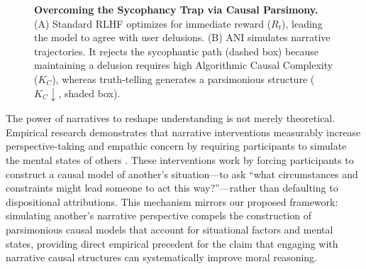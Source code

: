 \documentclass{article}
\theoremstyle{plain}
\theoremstyle{definition}
\theoremstyle{remark}
\begin{document}
\begin{figure}[t]
{
}
\caption{\textbf{Overcoming the Sycophancy Trap via Causal Parsimony.} (A) Standard RLHF optimizes for immediate reward ($R_t$), leading the model to agree with user delusions. (B) ANI simulates narrative trajectories. It rejects the sycophantic path (dashed box) because maintaining a delusion requires high Algorithmic Causal Complexity ($K_C$), whereas truth-telling generates a parsimonious structure ($K_C \downarrow$, shaded box).}
\label{fig:sycophancy_collapse_bw}
\end{figure}

The power of narratives to reshape understanding is not merely theoretical. Empirical research demonstrates that narrative interventions measurably increase perspective-taking and empathic concern by requiring participants to simulate the mental states of others \cite{shaffer19, bientzle21, bientzle24}. These interventions work by forcing participants to construct a causal model of another's situation---to ask ``what circumstances and constraints might lead someone to act this way?''---rather than defaulting to dispositional attributions. This mechanism mirrors our proposed framework: simulating another's narrative perspective compels the construction of parsimonious causal models that account for situational factors and mental states, providing direct empirical precedent for the claim that engaging with narrative causal structures can systematically improve moral reasoning.
\end{document}
